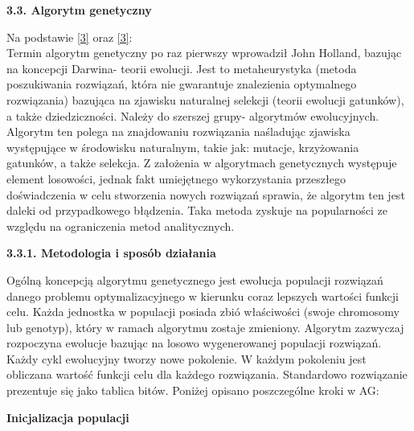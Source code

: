 \documentclass[a4paper, twoside, 12pt, justified]{article}
\begin{document}
	\begin{flushleft}
		\begin{large}
			\textbf{3.3. Algorytm genetyczny}
		\end{large}
	\end{flushleft}
	\vspace{5mm} %
	
	Na podstawie \hyperlink{ag}{[3]} oraz \hyperlink{ag_operators}{[3]}:\\
	Termin algorytm genetyczny po raz pierwszy wprowadził John Holland, bazując na koncepcji Darwina- teorii ewolucji. Jest to metaheurystyka (metoda poszukiwania rozwiązań, która nie gwarantuje znalezienia optymalnego rozwiązania) bazująca na zjawisku naturalnej selekcji (teorii ewolucji gatunków), a także dziedziczności. Należy do szerszej grupy- algorytmów ewolucyjnych. Algorytm ten polega na znajdowaniu rozwiązania naśladując zjawiska występujące w środowisku naturalnym, takie jak: mutacje, krzyżowania gatunków, a także selekcja. Z założenia w algorytmach genetycznych występuje element losowości, jednak fakt umiejętnego wykorzystania przeszłego doświadczenia w celu stworzenia nowych rozwiązań sprawia, że algorytm ten jest daleki od przypadkowego błądzenia. Taka metoda zyskuje na popularności ze względu na ograniczenia metod analitycznych.\\
	
	\begin{large}
		\begin{flushleft}
			\textbf{3.3.1. Metodologia i sposób działania}
		\end{flushleft}
	\end{large}
	
	Ogólną koncepcją algorytmu genetycznego jest ewolucja populacji rozwiązań danego problemu optymalizacyjnego w kierunku coraz lepszych wartości funkcji celu. Każda jednostka w populacji posiada zbió właściwości (swoje chromosomy lub genotyp), który w ramach algorytmu zostaje zmieniony. Algorytm zazwyczaj rozpoczyna ewolucje bazując na losowo wygenerowanej populacji rozwiązań. Każdy cykl ewolucyjny tworzy nowe pokolenie. W każdym pokoleniu jest obliczana wartość funkcji celu dla każdego rozwiązania. Standardowo rozwiązanie prezentuje się jako tablica bitów. Poniżej opisano poszczególne kroki w AG:\\
	
	\begin{center}
		\textbf{Inicjalizacja populacji}
	\end{center}
	
\end{document}
